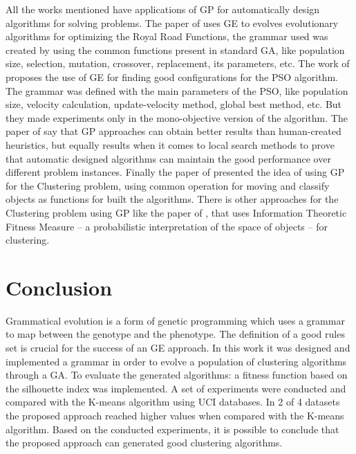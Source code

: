 \documentclass[journal]{IEEEtran}
\begin{document}
	All the works mentioned have applications of GP for automatically design algorithms for solving problems. The paper of \cite{lourencco2012evolving} uses GE to evolves evolutionary algorithms for optimizing the Royal Road Functions, the grammar used was created by using the common functions present in standard GA, like population size, selection, mutation, crossover, replacement, its parameters, etc. The work of \cite{miranda2015gefpso} proposes the use of GE for finding good configurations for the PSO algorithm. The grammar was defined with the main parameters of the PSO, like population size, velocity calculation, update-velocity method, global best method, etc. But they made experiments only in the mono-objective version of the algorithm. The paper of \cite{burke2012grammatical} say that GP approaches can obtain better results than human-created heuristics, but equally results when it comes to local search methods to prove that automatic designed algorithms can maintain the good performance over different problem instances. Finally the paper of \cite{bolton2015optimizing} presented the idea of using GP for the Clustering problem, using common operation for moving and classify objects as functions for built the algorithms. There is other approaches for the Clustering problem using GP like the paper of \cite{boric2007genetic}, that uses Information Theoretic Fitness Measure -- a probabilistic interpretation of the space of objects -- for clustering.
	
		
	\section{Conclusion}
	\label{sec:conclusion}
	
	Grammatical evolution is a form of genetic programming which uses a grammar to map between the genotype and the phenotype. The definition of a good rules set is crucial for the success of an GE approach. In this work it was designed and implemented a grammar in order to evolve a population of clustering algorithms through a GA. To evaluate the generated algorithms: a fitness function based on the silhouette index was implemented.
	A set of experiments were conducted and compared with the K-means algorithm using UCI databases. In 2 of 4 datasets the proposed approach reached higher values when compared with the K-means algorithm.
	Based on the conducted experiments, it is possible to conclude that the proposed approach can generated good clustering algorithms.
	
	
	
	
\end{document}
